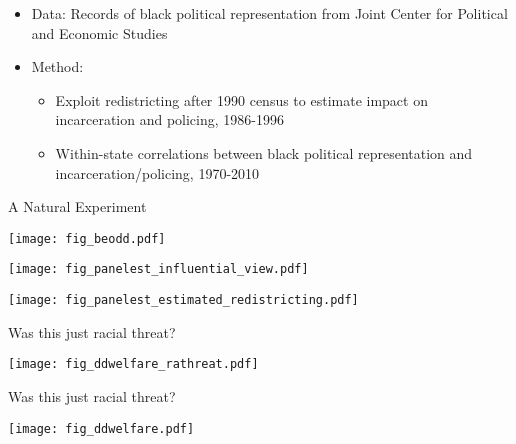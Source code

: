 \documentclass{beamer}
\newcommand{\claimfive}{Due to white politicians' support of punitive policy, the rate of incarceration and policing increased}
\begin{document}
\begin{frame}{\claimfiveq}
\begin{itemize}
    \item[] \alert{Data:} Records of black political representation from Joint Center for Political and Economic Studies
    \item[] \alert{Method:}
    \begin{itemize}
        \item \alert{Exploit redistricting after 1990 census to estimate impact on incarceration and policing, 1986-1996}
        \item Within-state correlations between black political representation and incarceration/policing, 1970-2010
    \end{itemize}
\end{itemize}
\end{frame}

\begin{frame}{A Natural Experiment} 
\begin{center}
    \texttt{[image: fig\_beodd.pdf]}
\end{center}
\end{frame}

\begin{frame}{\claimfiveq}
\begin{center}
    \texttt{[image: fig\_panelest\_influential\_view.pdf]}
\end{center}
\end{frame}

\begin{frame}{\claimfiveq}
\begin{center}
    \texttt{[image: fig\_panelest\_estimated\_redistricting.pdf]}
\end{center}
\end{frame}

\begin{frame}{Was this just racial threat?}
\begin{center}
    \texttt{[image: fig\_ddwelfare\_rathreat.pdf]}
\end{center}
\end{frame}

\begin{frame}{Was this just racial threat?}
\begin{center}
    \texttt{[image: fig\_ddwelfare.pdf]}
\end{center}
\end{frame}
\end{document}
